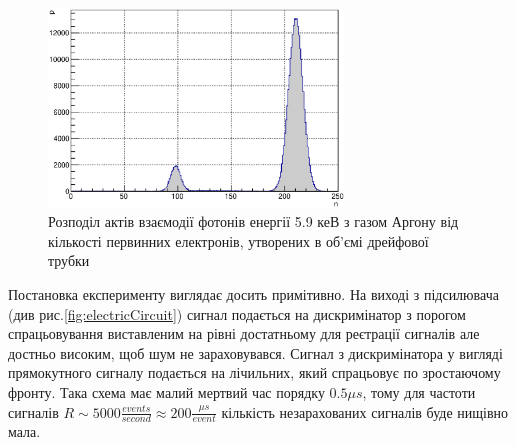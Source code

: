 \documentclass[pdftex,14pt]{scrartcl}
\def\mean#1{\left< #1 \right>}
\begin{document}
\begin{spacing}{1.5}
	\begin{figure}[!h]
	\centering
	\includegraphics[width=0.7\textwidth]{fe55neGamma}
	\caption{ Розподіл актів взаємодії фотонів енергії 5.9 кеВ з газом Аргону від кількості первинних електронів, утворених в об’ємі дрейфової трубки}
	\label{fig:fe55_n_probability}
	\end{figure}
	
	
	
	
		
	Постановка експерименту виглядає досить примітивно. На виході з підсилювача (див рис.\ref{fig:electricCircuit}) сигнал подається на дискримінатор з порогом спрацьовування виставленим на рівні достатньому для реєтрації сигналів але достньо високим, щоб шум не зараховувався. Сигнал з дискримінатора у вигляді прямокутного сигналу подається на лічильних, який спрацьовує по зростаючому фронту. Така схема має малий мертвий час порядку $0.5 \mu s$, тому для частоти сигналів $R \sim 5000 \frac{events}{second} \approx 200 \frac{\mu s}{event}$ кількість незарахованих сигналів буде нищівно мала.
	

\end{spacing}
\end{document}
